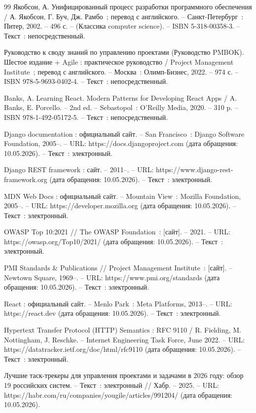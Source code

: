 \begin{thebibliography}{99}
	 Якобсон, А. Унифицированный процесс разработки программного обеспечения / А. Якобсон, Г. Буч, Дж. Рамбо~; перевод с английского. -- Санкт-Петербург~: Питер, 2002. -- 496 с. -- (Классика computer science). -- ISBN 5-318-00358-3. -- Текст~: непосредственный.

	 Руководство к своду знаний по управлению проектами (Руководство PMBOK). Шестое издание + Agile : практическое руководство / Project Management Institute~; перевод с английского. -- Москва~: Олимп-Бизнес, 2022. -- 974 с. -- ISBN 978-5-9693-0402-4. -- Текст~: непосредственный.

	 Banks, A. Learning React. Modern Patterns for Developing React Apps / A. Banks, E. Porcello. -- 2nd ed. -- Sebastopol~: O'Reilly Media, 2020. -- 310 p. -- ISBN 978-1-492-05172-5. -- Текст~: непосредственный.

	 Django documentation : официальный сайт. -- San Francisco~: Django Software Foundation, 2005--. -- URL: https://docs.djangoproject.com (дата обращения: 10.05.2026). -- Текст~: электронный.

	 Django REST framework : сайт. -- 2011--. -- URL: https://www.django-rest-framework.org (дата обращения: 10.05.2026). -- Текст~: электронный.

	 MDN Web Docs : официальный сайт. -- Mountain View~: Mozilla Foundation, 2005--. -- URL: https://developer.mozilla.org (дата обращения: 10.05.2026). -- Текст~: электронный.

	 OWASP Top 10:2021 // The OWASP Foundation~: [сайт]. -- 2021. -- URL: https://owasp.org/Top10/2021/ (дата обращения: 10.05.2026). -- Текст~: электронный.

	 PMI Standards \& Publications // Project Management Institute~: [сайт]. -- Newtown Square, 1969--. -- URL: https://www.pmi.org/standards (дата обращения: 10.05.2026). -- Текст~: электронный.

	 React : официальный сайт. -- Menlo Park~: Meta Platforms, 2013--. -- URL: https://react.dev (дата обращения: 10.05.2026). -- Текст~: электронный.

	 Hypertext Transfer Protocol (HTTP) Semantics : RFC 9110 / R. Fielding, M. Nottingham, J. Reschke. -- Internet Engineering Task Force, June 2022. -- URL: https://datatracker.ietf.org/doc/html/rfc9110 (дата обращения: 10.05.2026). -- Текст~: электронный.

	 Лучшие таск-трекеры для управления проектами и задачами в 2026 году: обзор 19 российских систем. -- Текст~: электронный // Хабр. -- 2025. -- URL: https://habr.com/ru/companies/yougile/articles/991204/ (дата обращения: 10.05.2026).

\end{thebibliography}
